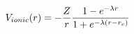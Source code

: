 \documentclass[preview]{standalone}
\begin{document}
$$ V_{ionic}(r) = - { Z \over r } { 1 - e^{-\lambda r} \over 1 + e^{-\lambda(r-r_{c}) } } $$
\end{document}
